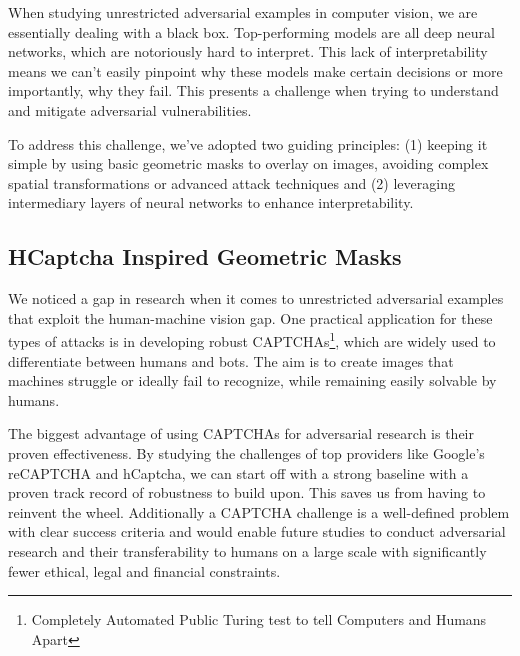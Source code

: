 \documentclass[a4paper, oneside]{discothesis}
\begin{document}
When studying unrestricted adversarial examples in computer vision, we are essentially dealing with a black box. Top-performing models are all deep neural networks, which are notoriously hard to interpret. This lack of interpretability means we can't easily pinpoint why these models make certain decisions or more importantly, why they fail. This presents a challenge when trying to understand and mitigate adversarial vulnerabilities.

To address this challenge, we've adopted two guiding principles: (1) keeping it simple by using basic geometric masks to overlay on images, avoiding complex spatial transformations or advanced attack techniques and (2) leveraging intermediary layers of neural networks to enhance interpretability.

\subsection{HCaptcha Inspired Geometric Masks}

We noticed a gap in research when it comes to unrestricted adversarial examples that exploit the human-machine vision gap. One practical application for these types of attacks is in developing robust CAPTCHAs\footnote{Completely Automated Public Turing test to tell Computers and Humans Apart}, which are widely used to differentiate between humans and bots. The aim is to create images that machines struggle or ideally fail to recognize, while remaining easily solvable by humans.

The biggest advantage of using CAPTCHAs for adversarial research is their proven effectiveness. By studying the challenges of top providers like Google's reCAPTCHA and hCaptcha, we can start off with a strong baseline \textendash{} with a proven track record of robustness \textendash{} to build upon. This saves us from having to reinvent the wheel. Additionally a CAPTCHA challenge is a well-defined problem with clear success criteria and would enable future studies to conduct adversarial research and their transferability to humans on a large scale with significantly fewer ethical, legal and financial constraints.
\end{document}
